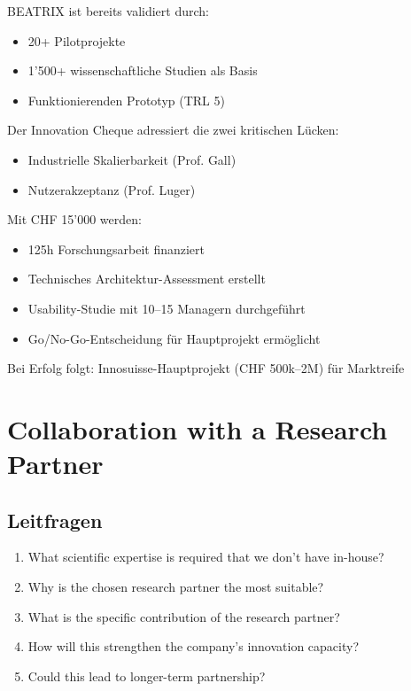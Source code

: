 \documentclass[11pt,a4paper]{article}
\begin{document}
\begin{summarybox}
BEATRIX ist bereits validiert durch:
\begin{itemize}
    \item 20+ Pilotprojekte
    \item 1'500+ wissenschaftliche Studien als Basis
    \item Funktionierenden Prototyp (TRL 5)
\end{itemize}

Der Innovation Cheque adressiert die zwei kritischen Lücken:
\begin{itemize}
    \item Industrielle Skalierbarkeit (Prof. Gall)
    \item Nutzerakzeptanz (Prof. Luger)
\end{itemize}

Mit CHF 15'000 werden:
\begin{itemize}
    \item 125h Forschungsarbeit finanziert
    \item Technisches Architektur-Assessment erstellt
    \item Usability-Studie mit 10--15 Managern durchgeführt
    \item Go/No-Go-Entscheidung für Hauptprojekt ermöglicht
\end{itemize}

Bei Erfolg folgt: Innosuisse-Hauptprojekt (CHF 500k--2M) für Marktreife
\end{summarybox}

\newpage

\section{Collaboration with a Research Partner}

\subsection{Leitfragen}

\begin{enumerate}
    \item What scientific expertise is required that we don't have in-house?
    \item Why is the chosen research partner the most suitable?
    \item What is the specific contribution of the research partner?
    \item How will this strengthen the company's innovation capacity?
    \item Could this lead to longer-term partnership?
\end{enumerate}
\end{document}
